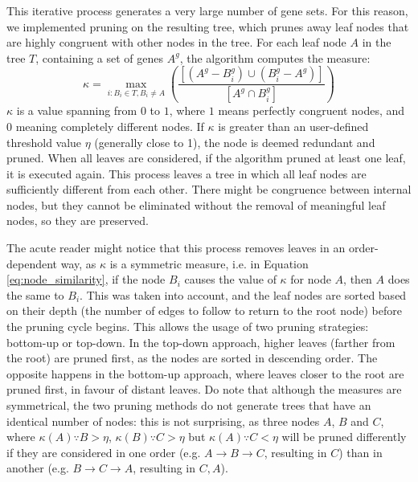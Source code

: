 This iterative process generates a very large number of gene sets. %
For this reason, we implemented pruning on the resulting tree, which prunes away leaf nodes that are highly congruent with other nodes in the tree. For each leaf node $A$ in the tree $T$, containing a set of genes $A^g$, the algorithm computes the measure:
\begin{equation}
    \kappa = \max_{i:B_i \in T, B_i \ne A}\left(\frac{[(A^g - B_i^g) \cup (B_i^g - A^g)]}{[A^g \cap B_i^g]}\right)
    \label{eq:node_similarity}
\end{equation}
$\kappa$ is a value spanning from $0$ to $1$, where $1$ means perfectly congruent nodes, and $0$ meaning completely different nodes. If $\kappa$ is greater than an user-defined threshold value $\eta$ (generally close to 1), %
the node is deemed redundant and pruned. When all leaves are considered, if the algorithm pruned at least one leaf, it is executed again. This process leaves a tree in which all leaf nodes are sufficiently different from each other. There might be congruence between internal nodes, but they cannot be eliminated without the removal of meaningful leaf nodes, so they are preserved.

The acute reader might notice that this process removes leaves in an order-dependent way, as $\kappa$ is a symmetric measure, i.e. in Equation \ref{eq:node_similarity}, if the node $B_i$ causes the value of $\kappa$ for node $A$, then $A$ does the same to $B_i$. %
This was taken into account, and the leaf nodes are sorted based on their depth (the number of edges to follow to return to the root node) before the pruning cycle begins. This allows the usage of two pruning strategies: bottom-up or top-down. In the top-down approach, higher leaves (farther from the root) are pruned first, as the nodes are sorted in descending order. The opposite happens in the bottom-up approach, where leaves closer to the root are pruned first, in favour of distant leaves.
Do note that although the measures are symmetrical, the two pruning methods do not generate trees that have an identical number of nodes: this is not surprising, as three nodes $A$, $B$ and $C$, where $\kappa(A) \because B > \eta$, $\kappa(B) \because C > \eta$ but $\kappa(A)  \because C < \eta$ will be pruned differently if they are considered in one order (e.g. $A \rightarrow B \rightarrow C$, resulting in $C$) than in another (e.g. $B \rightarrow C \rightarrow A$, resulting in $C, A$).

